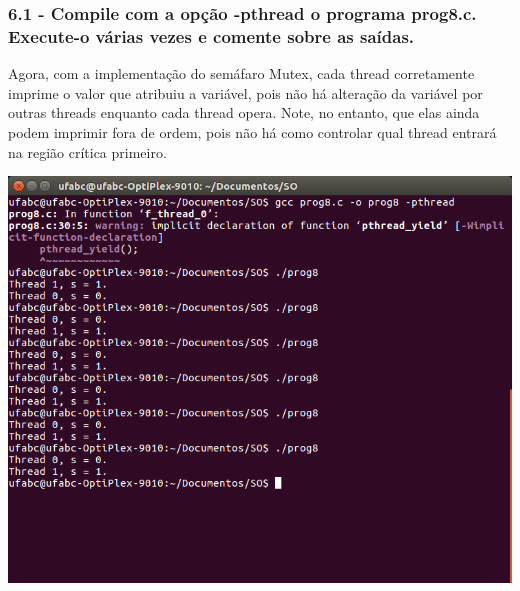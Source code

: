 \subsubsection{6.1 - Compile com a opção -pthread o programa prog8.c. Execute-o várias vezes e comente sobre as saídas.}

\vspace{-0.5em}
\begin{minipage}{\textwidth}
  \hspace{-1em}
  \centering
  
  \label{prog4mod}
  \hspace{1em}
\end{minipage}
\vspace{0.5em}

Agora, com a implementação do semáfaro Mutex, cada thread corretamente imprime o valor que atribuiu a variável, pois não há alteração da variável por outras threads enquanto cada thread opera. Note, no entanto, que elas ainda podem imprimir fora de ordem, pois não há como controlar qual thread entrará na região crítica primeiro.

\vspace{2em}
\begin{minipage}{\textwidth}
    \hspace{-1em}
    \centering
    \includegraphics[trim=0 110 0 0,clip,scale=.4]{pratica1/prog8.png}
    \label{prog4modpng}
    \hspace{1em}
\end{minipage}

